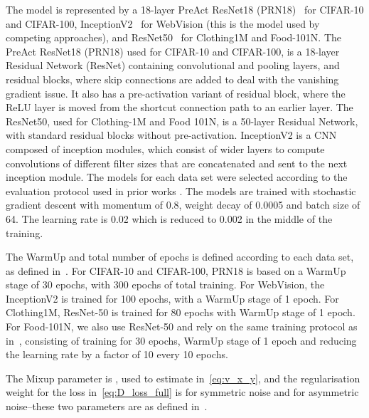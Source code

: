 \documentclass[review]{elsarticle}
\begin{document}
The model  is represented by a 18-layer PreAct ResNet18 (PRN18)~\cite{he2016identity} 
 for CIFAR-10 and CIFAR-100, InceptionV2~\cite{szegedy2017inception} for WebVision (this is the model used by competing approaches), and ResNet50~\cite{he2016deep} for Clothing1M and Food-101N. The  PreAct ResNet18 (PRN18) used for CIFAR-10 and CIFAR-100, is a 18-layer Residual Network (ResNet) containing convolutional and pooling layers, and residual blocks, where skip connections are added to deal with the vanishing gradient issue. It also has a pre-activation variant of residual block, where the ReLU layer is moved from the shortcut connection path to an earlier layer. The ResNet50, used for Clothing-1M and Food 101N, is a 50-layer Residual Network,  with standard residual blocks without pre-activation. InceptionV2 is a CNN composed of inception modules, which consist of wider layers to compute convolutions of different filter sizes that are concatenated and sent to the next inception module. The models for each data set were selected according to the evaluation protocol used in prior works \cite{li2020dividemix, li2019learning, arazo2019unsupervised, yu2019does, xiao2015learning}. 
The models are trained with stochastic gradient descent with momentum of 0.8, weight decay of 0.0005 and batch size of 64. The learning rate is 0.02 which is reduced to 0.002 in the middle of the training. 

The WarmUp and total number of epochs is defined according to each data set, as defined in~\cite{li2020dividemix}.
For CIFAR-10 and CIFAR-100, PRN18 is based on a WarmUp stage of 30 epochs, with 300 epochs of total training.
For WebVision, the InceptionV2 is trained for 100 epochs, with a WarmUp stage of 1 epoch.
For Clothing1M, ResNet-50 is trained for 80 epochs with WarmUp stage of 1 epoch.
For Food-101N, we also use ResNet-50 and rely on the same training protocol as in~\cite{han2019deep}, consisting of training for 30 epochs, WarmUp stage of 1 epoch and reducing the learning rate by a factor of 10 every 10 epochs.



The Mixup parameter is , used to estimate  in~\eqref{eq:v_x_y}, and 
the regularisation weight for the loss in~\eqref{eq:D_loss_full} is  for symmetric noise and  for asymmetric noise--these two parameters are as defined in~\cite{li2020dividemix}. 
\end{document}
